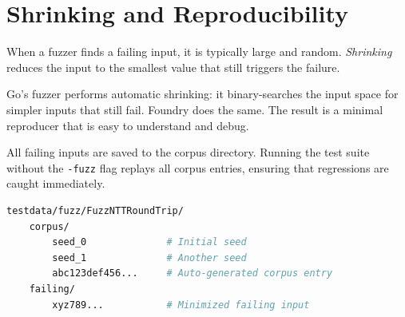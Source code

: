 \section{Shrinking and Reproducibility}


When a fuzzer finds a failing input, it is typically large and random. \emph{Shrinking}
reduces the input to the smallest value that still triggers the failure.

Go's fuzzer performs automatic shrinking: it binary-searches the input space for simpler
inputs that still fail. Foundry does the same. The result is a minimal reproducer that
is easy to understand and debug.

All failing inputs are saved to the corpus directory. Running the test suite without the
\texttt{-fuzz} flag replays all corpus entries, ensuring that regressions are caught
immediately.

\begin{lstlisting}[language=bash,caption={Corpus directory structure}]
testdata/fuzz/FuzzNTTRoundTrip/
    corpus/
        seed_0              # Initial seed
        seed_1              # Another seed
        abc123def456...     # Auto-generated corpus entry
    failing/
        xyz789...           # Minimized failing input
\end{lstlisting}

